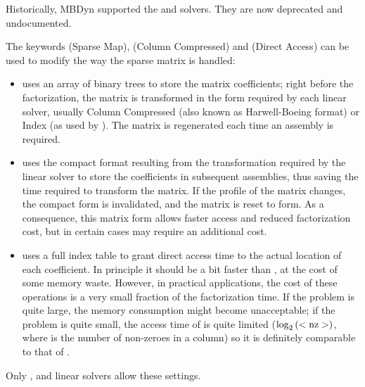 \begin{comment}
Another linear solver, that is available mostly for historical reasons, 
is \kw{harwell}, with a \kw{workspace size}
of $ \kw{numdofs}\times\kw{numdofs} $, but in certain cases the user
might prefer a smaller workspace, since the matrix is handled as sparse,
while sometimes a larger space is required, since when the matrix is
full, a little more space is required, due to extra storage needs when
the matrix fills up.
\end{comment}

Historically, MBDyn supported the  and  solvers.
They are now deprecated and undocumented.


The keywords  (Sparse Map),  (Column Compressed)
and  (Direct Access) can be used to modify the way
the sparse matrix is handled:
\begin{itemize}
\item {} uses an array of binary trees to store the matrix
coefficients; right before the factorization, the matrix is transformed
in the form required by each linear solver, usually Column Compressed
(also known as Harwell-Boeing format) or Index (as used by ).
The matrix is regenerated each time an assembly is required.
\item {} uses the compact format resulting from the transformation
required by the linear solver to store the coefficients in subsequent assemblies,
thus saving the time required to transform the matrix.
If the profile of the matrix changes, the compact form is invalidated,
and the matrix is reset to  form.  As a consequence, this matrix
form allows faster access and reduced factorization cost, but in certain
cases may require an additional cost.
\item {} uses a full index table to grant direct access time to
the actual location of each coefficient.
In principle it should be a bit faster than , at the cost
of some memory waste.
However, in practical applications, the cost of these operations
is a very small fraction of the factorization time.
If the problem is quite large, the memory consumption might
become unacceptable; if the problem is quite small, the access time
of  is quite limited ($\log_2\left( \mathrm{<nz>} \right)$, where
 is the number of non-zeroes in a column) so it is definitely
comparable to that of .
\end{itemize}
Only ,  and  linear solvers allow these
settings.

